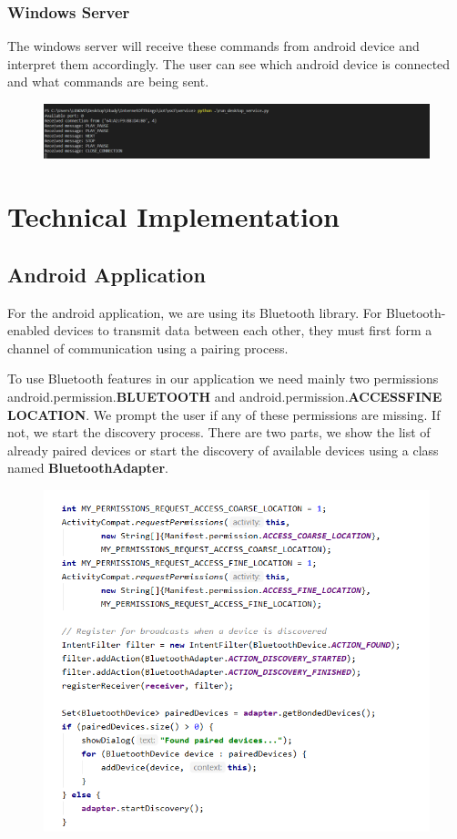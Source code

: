 \documentclass{article}
\begin{document}
\subsubsection{Windows Server}
The windows server will receive these commands from android device and interpret them accordingly.
The user can see which android device is connected and what commands are being sent.

\begin{figure}[ht]
\centering
\includegraphics[scale=.3]{./service.png}
\end{figure}


\section{Technical Implementation}

\subsection{Android Application}

For the android application, we are using its Bluetooth library. For Bluetooth-enabled devices to
transmit data between each other, they must first form a channel of communication using a pairing
process.

To use Bluetooth features in our application we need mainly two permissions
android.permission.\textbf{BLUETOOTH} and android.permission.\textbf{ACCESS\textunderscore FINE
\textunderscore LOCATION}. We prompt the user if any of these permissions are missing. If not, we
start the discovery process. There are two parts, we show the list of already paired devices or
start the discovery of available devices using a class named \textbf{   BluetoothAdapter}.

\begin{figure}[ht]
\centering
\includegraphics[scale=.5]{./discoverDevice.png}
\end{figure}
\end{document}
